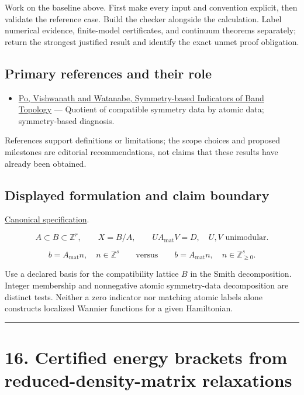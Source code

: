 \documentclass[
  11pt,
]{article}
\providecommand{\tightlist}{%
  \setlength{\itemsep}{0pt}\setlength{\parskip}{0pt}}
\begin{document}
Work on the baseline above. First make every input and convention
explicit, then validate the reference case. Build the checker alongside
the calculation. Label numerical evidence, finite-model certificates,
and continuum theorems separately; return the strongest justified result
and identify the exact unmet proof obligation.

\subsection{Primary references and their role}

\begin{itemize}
\tightlist
\item
  \href{https://arxiv.org/abs/1703.00911}{Po, Vishwanath and Watanabe,
  Symmetry-based Indicators of Band Topology} --- Quotient of compatible
  symmetry data by atomic data; symmetry-based diagnosis.
\end{itemize}

References support definitions or limitations; the scope choices and
proposed milestones are editorial recommendations, not claims that these
results have already been obtained.

\subsection{Displayed formulation and claim boundary}

\href{https://github.com/rick-stevens-ai/Pure-Thought/blob/main/PRDs/15-Topological-Quantum-Chemistry.md}{Canonical
specification}.

\[A\subset B\subset\mathbb Z^r,\qquad X=B/A,\qquad
UA_{\mathrm{mat}}V=D,\quad U,V\text{ unimodular}.\]

\[b=A_{\mathrm{mat}}n,\quad n\in\mathbb Z^s
\qquad\text{versus}\qquad b=A_{\mathrm{mat}}n,\quad n\in\mathbb Z_{\ge0}^s.\]

Use a declared basis for the compatibility lattice \(B\) in the Smith
decomposition. Integer membership and nonnegative atomic symmetry-data
decomposition are distinct tests. Neither a zero indicator nor matching
atomic labels alone constructs localized Wannier functions for a given
Hamiltonian.

\begin{center}\rule{0.5\linewidth}{0.5pt}\end{center}

\section{16. Certified energy brackets from reduced-density-matrix
relaxations}
\end{document}
